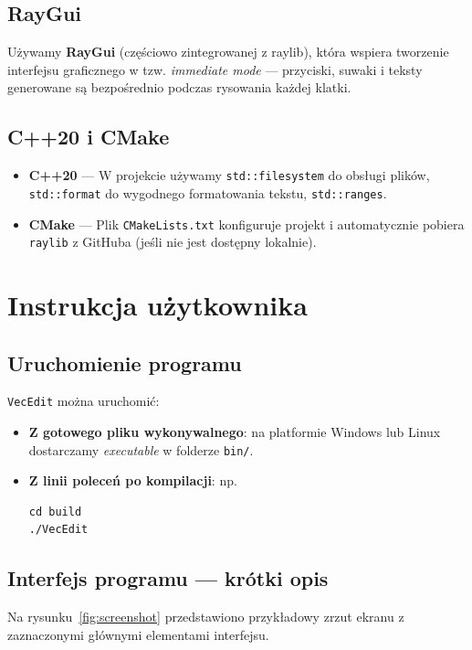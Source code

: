 \documentclass[a4paper,12pt]{article}
\begin{document}
\subsection{RayGui}
Używamy \textbf{RayGui} (częściowo zintegrowanej z raylib), która wspiera tworzenie
interfejsu graficznego w tzw. \emph{immediate mode} — przyciski, suwaki i 
teksty generowane są bezpośrednio podczas rysowania każdej klatki.

\subsection{C++20 i CMake}
\begin{itemize}
    \item \textbf{C++20} — W projekcie używamy \texttt{std::filesystem} do obsługi plików,
      \texttt{std::format} do wygodnego formatowania tekstu, \texttt{std::ranges}.
    \item \textbf{CMake} — Plik \texttt{CMakeLists.txt} konfiguruje projekt
      i automatycznie pobiera \texttt{raylib} z GitHuba (jeśli nie jest dostępny lokalnie).
\end{itemize}

\section{Instrukcja użytkownika}

\subsection{Uruchomienie programu}
\texttt{VecEdit} można uruchomić:
\begin{itemize}
    \item \textbf{Z gotowego pliku wykonywalnego}: na platformie Windows lub Linux
    dostarczamy \emph{executable} w folderze \texttt{bin/}.
    \item \textbf{Z linii poleceń po kompilacji}: np.
\begin{verbatim}
cd build
./VecEdit
\end{verbatim}
\end{itemize}

\subsection{Interfejs programu — krótki opis}
Na rysunku~\ref{fig:screenshot} przedstawiono przykładowy zrzut ekranu 
z zaznaczonymi głównymi elementami interfejsu.
\end{document}
